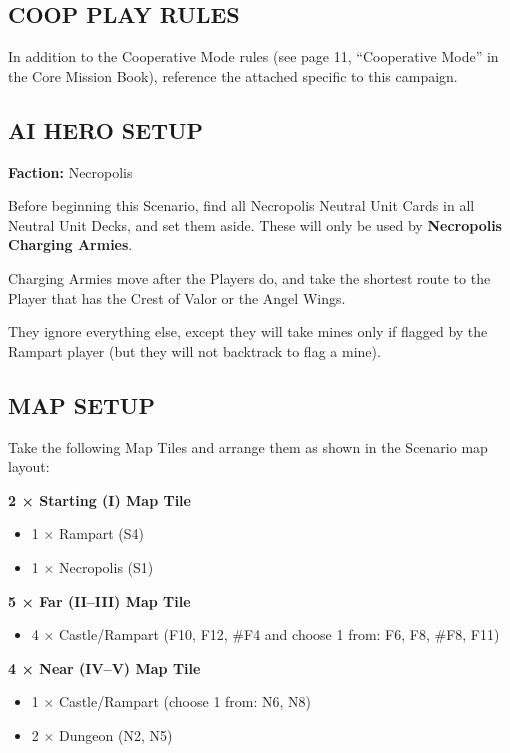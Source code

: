 \begin{multicols*}{2}
\subsection*{\MakeUppercase{Coop Play Rules}}

In addition to the Cooperative Mode rules (see page 11, ``Cooperative Mode'' in the Core Mission Book), reference the attached  specific to this campaign.

\subsection*{\MakeUppercase{AI Hero Setup}}

\textbf{Faction:} Necropolis

Before beginning this Scenario, find all Necropolis Neutral Unit Cards in all Neutral Unit Decks, and set them aside.
These will only be used by \textbf{Necropolis Charging Armies}.

Charging Armies move after the Players do, and take the shortest route to the Player that has the Crest of Valor or the Angel Wings.

They ignore everything else, except they will take mines only if flagged by the Rampart player (but they will not backtrack to flag a mine).

\subsection*{\MakeUppercase{Map Setup}}

Take the following Map Tiles and arrange them as shown in the Scenario map layout:

\textbf{2 × Starting (I) Map Tile}
\begin{itemize}
  \item 1 × Rampart (S4)
  \item 1 × Necropolis (S1)
\end{itemize}

\textbf{5 × Far (II--III) Map Tile}
\begin{itemize}
  \item 4 × Castle/Rampart (F10, F12, \#F4 and choose 1 from: F6, F8, \#F8, F11)
\end{itemize}

\textbf{4 × Near (IV--V) Map Tile}
\begin{itemize}
  \item 1 × Castle/Rampart (choose 1 from: N6, N8)
  \item 2 × Dungeon (N2, N5)
\end{itemize}


\end{multicols*}
